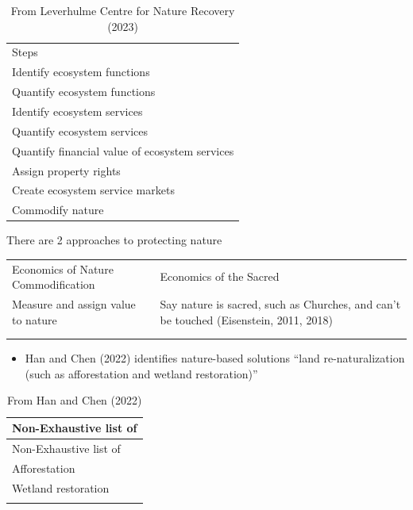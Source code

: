 \documentclass[
  letterpaper,
  DIV=11,
  numbers=noendperiod]{scrartcl}
\providecommand{\tightlist}{%
  \setlength{\itemsep}{0pt}\setlength{\parskip}{0pt}}\usepackage{longtable,booktabs,array}
\begin{document}
\begin{longtable}[]{@{}l@{}}
\caption{From Leverhulme Centre for Nature Recovery
(2023)}\tabularnewline
\toprule\noalign{}
\endfirsthead
\endhead
\bottomrule\noalign{}
\endlastfoot
9 Steps \\
Identify ecosystem functions \\
Quantify ecosystem functions \\
Identify ecosystem services \\
Quantify ecosystem services \\
Quantify financial value of ecosystem services \\
Assign property rights \\
Create ecosystem service markets \\
Commodify nature \\
\end{longtable}

There are 2 approaches to protecting nature

\begin{longtable}[]{@{}
  >{\raggedright\arraybackslash}p{}
  >{\raggedright\arraybackslash}p{}@{}}
\toprule\noalign{}
\endhead
\bottomrule\noalign{}
\endlastfoot
Economics of Nature Commodification & Economics of the Sacred \\
Measure and assign value to nature & Say nature is sacred, such as
Churches, and can't be touched (Eisenstein, 2011, 2018) \\
& \\
& \\
\end{longtable}

\begin{itemize}
\tightlist
\item
  Han and Chen (2022) identifies nature-based solutions ``land
  re-naturalization (such as afforestation and wetland restoration)''
\end{itemize}

\begin{longtable}[]{@{}l@{}}
\caption{From Han and Chen (2022)}\tabularnewline
\toprule\noalign{}
Non-Exhaustive list of \\
\midrule\noalign{}
\endfirsthead
\toprule\noalign{}
Non-Exhaustive list of \\
\midrule\noalign{}
\endhead
\bottomrule\noalign{}
\endlastfoot
Afforestation \\
Wetland restoration \\
 \\
\end{longtable}
\end{document}
